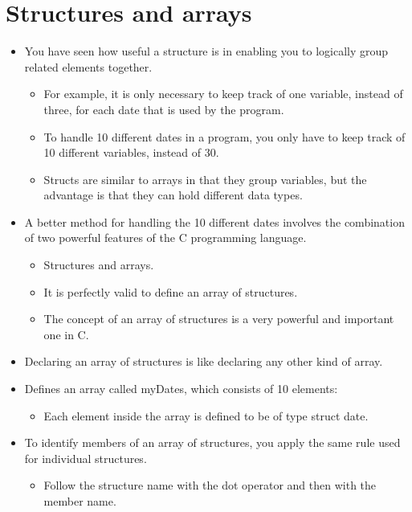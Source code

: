 \section{Structures and arrays}
\begin{itemize}
    \item You have seen how useful a structure is in enabling you to logically group related elements together.
        \begin{itemize}
            \item For example, it is only necessary to keep track of one variable, instead of three, for each date that is used by the program. 
            \item To handle 10 different dates in a program, you only have to keep track of 10 different variables, instead of 30. 
            \item Structs are similar to arrays in that they group variables, but the advantage is that they can hold different data types. 
        \end{itemize}
    
    \item A better method for handling the 10 different dates involves the combination of two powerful features of the C programming language.
        \begin{itemize}
            \item Structures and arrays.
            \item It is perfectly valid to define an array of structures. 
            \item The concept of an array of structures is a very powerful and important one in C.
        \end{itemize}
    
    \item Declaring an array of structures is like declaring any other kind of array. 
    
    \item Defines an array called myDates, which consists of 10 elements:
        \begin{itemize}
            \item Each element inside the array is defined to be of type struct date. 
        \end{itemize}
    
    \item To identify members of an array of structures, you apply the same rule used for individual structures. 
        \begin{itemize}
            \item Follow the structure name with the dot operator and then with the member name. 
        \end{itemize}
    

\end{itemize}
